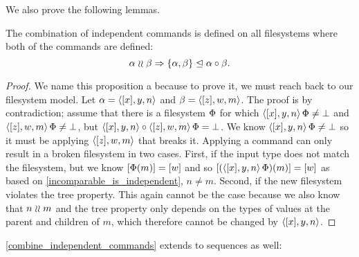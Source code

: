 We also prove the following lemmas.

\begin{myax}
The combination of independent commands is defined on all filesystems
where both of the commands are defined:
\[ \alpha\mathrel{\wr\wr} \beta \Rightarrow {\{{\alpha, \beta}\}}\trianglelefteq{\alpha\circ\beta}. \]
\end{myax}
\begin{proof}
We name this proposition a  
because to prove it, we must reach back to our filesystem model.
Let $\alpha=\langle{[x],y,n}\rangle$ and $\beta=\langle{[z],w,m}\rangle$.
The proof is by contradiction;
assume that there is a filesystem $\Phi$ for which
$\langle{[x],y,n}\rangle\,\Phi\neq\bot$ and $\langle{[z],w,m}\rangle\,\Phi\neq\bot$, but
$\langle{[x],y,n}\rangle\circ \langle{[z],w,m}\rangle\,\Phi=\bot$.
We know $\langle{[x],y,n}\rangle\,\Phi\neq\bot$ so it must be applying 
$\langle{[z],w,m}\rangle$ that breaks it.
Applying a command can only result in a broken filesystem in two cases.
First, if the input type does not match the filesystem,
but we know $[\Phi(m)]=[w]$ and so
$[(\langle{[x],y,n}\rangle\,\Phi)(m)]=[w]$ as based on \cref{incomparable_is_independent}, $n\neq m$.
Second, if the new filesystem violates the tree property.
This again cannot be the case because we also know that $n\mathrel{\wr\wr} m$
and the tree property only depends on the types of values at the parent and children of $m$,
which therefore cannot be changed by $\langle{[x],y,n}\rangle$.
\end{proof}

\cref{combine_independent_commands} extends to sequences as well:

